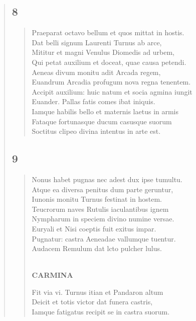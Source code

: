 \documentclass[11pt, a4paper]{report}
\begin{document}
\begin{verse}
  \subsection*{8}
      \begin{verse}
      Praeparat octavo bellum  \lbrack et \rbrack  quos mittat in hostis. \\ Dat belli signum Laurenti Turnus ab arce, \\ Mititur et magni Venulus Diomedis ad urbem, \\ Qui petat auxilium et doceat, quae causa petendi. \\ Aeneas divum monitu adit Arcada regem, \\ Euandrum Arcadia profugum nova regna tenentem. \\ Accipit auxilium: huic natum et socia agmina iungit \\ Euander. Pallas fatis comes ibat iniquis. \\ Iamque habilis bello et maternis laetus in armis \\ Fataque fortunasque ducum casusque suorum \\ Soctitus clipeo divina intentus in arte est. \\ 
      \end{verse}
  \subsection*{9}
      \begin{verse}
      Nonus habet pugnas nec adest dux ipse tumultu. \\ Atque ea diversa penitus dum parte geruntur, \\ Iunonis monitu Turnus festinat in hostem. \\ Teucrorum naves Rutulis iaculantibus ignem \\ Nympharum in speciem divino numine versae. \\ Euryali et Nisi coeptis fuit exitus impar. \\ Pugnatur: castra Aeneadae vallumque tuentur. \\ Audacem Remulum dat lcto pulcher lulus. \\ 
        ﻿\pagebreak 
    \begin{center} \textbf{CARMINA} \end{center} \marginpar{[14]} Fit via vi. Turnus itian et Pandaron altum \\ Deicit et totis victor dat funera castris, \\ Iamque fatigatus recipit se in castra suorum. \\ 
      \end{verse}

\end{verse}
\end{document}
